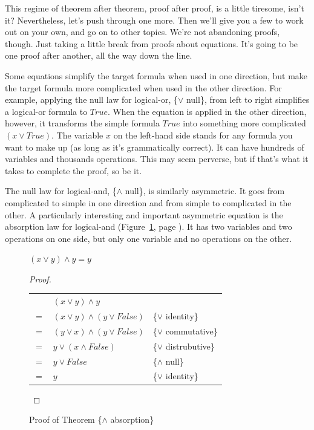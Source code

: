 This regime of theorem after theorem, proof after proof, is a little tiresome, isn't it?
Nevertheless, let's push through one more.
Then we'll give you a few to work out on your own, and go on to other topics.
We're not abandoning proofs, though.
Just taking a little break from proofs about equations.
It's going to be one proof after another, all the way down the line.

Some equations simplify the target formula when used in one direction,
but make the target formula more complicated when used in the other direction.
For example, applying
the null law for logical-or, \{$\vee$ null\}, from left to right simplifies a logical-or formula to $True$.
When the equation is applied in the other direction, however,
it transforms the simple formula $True$ into something more complicated $(x \vee True)$.
The variable $x$ on the left-hand side
stands for any formula you want to make up (as long as it's grammatically correct).
It can have hundreds of variables and thousands operations.
This may seem perverse, but if that's what it takes to complete the proof, so be it.

The null law for logical-and, \{$\wedge$ null\}, is similarly asymmetric.
It goes from complicated to simple in one direction
and from simple to complicated in the other.
A particularly interesting and important asymmetric equation
is the absorption law for logical-and
(Figure~\ref{and-absorption-thm}, page \pageref{and-absorption-thm}).
It has two variables and two operations on one side, but only one variable and no operations on the other.

\begin{figure}
\begin{theorem}
$(x \vee y) \wedge y = y$
\end{theorem}

\begin{proof}
\mbox{} \\
\begin{tabular}{llp{3.15in}}
    & $(x \vee y) \wedge y$                & \\
$=$ & $(x \vee y) \wedge (y \vee False)$   & \{$\vee$ identity\} \\
$=$ & $(y \vee x) \wedge (y \vee False)$   & \{$\vee$ commutative\} \\
$=$ & $y \vee (x \wedge False)$            & \{$\vee$ distrubutive\} \\
$=$ & $y \vee False$                       & \{$\wedge$ null\} \\
$=$ & $y$                                  & \{$\vee$ identity\} \\
\end{tabular}

\end{proof}
\caption{Proof of Theorem \{$\wedge$ absorption\}}
\label{and-absorption-thm}
\end{figure}

